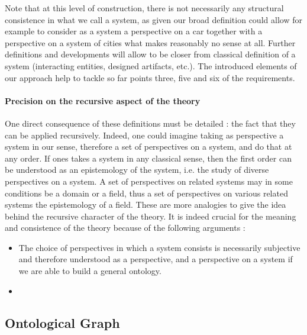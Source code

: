 Note that at this level of construction, there is not necessarily any structural consistence in what we call a system, as given our broad definition could allow for example to consider as a system a perspective on a car together with a perspective on a system of cities what makes reasonably no sense at all. Further definitions and developments will allow to be closer from classical definition of a system (interacting entities, designed artifacts, etc.). The introduced elements of our approach help to tackle so far points three, five and six of the requirements.

\paragraph{Precision on the recursive aspect of the theory}

One direct consequence of these definitions must be detailed : the fact that they can be applied recursively. Indeed, one could imagine taking as perspective a system in our sense, therefore a set of perspectives on a system, and do that at any order. If ones takes a system in any classical sense, then the first order can be understood as an epistemology of the system, i.e. the study of diverse perspectives on a system. A set of perspectives on related systems may in some conditions be a domain or a field, thus a set of perspectives on various related systems the epistemology of a field. These are more analogies to give the idea behind the recursive character of the theory. It is indeed crucial for the meaning and consistence of the theory because of the following arguments :
\begin{itemize}
\item The choice of perspectives in which a system consists is necessarily subjective and therefore understood as a perspective, and a perspective on a system if we are able to build a general ontology.
\item 
\end{itemize}



\subsection*{Ontological Graph}


